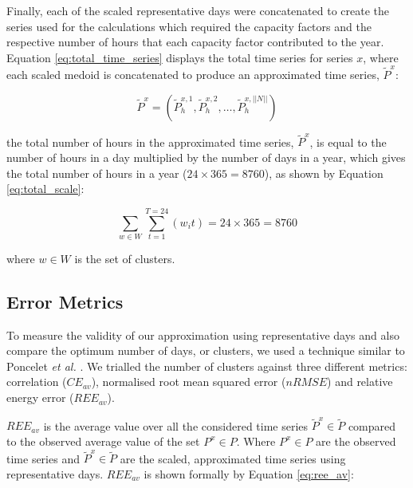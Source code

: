 
Finally, each of the scaled representative days were concatenated to create the series used for the calculations which required the capacity factors and the respective number of hours that each capacity factor contributed to the year. Equation \ref{eq:total_time_series} displays the total time series for series $x$, where each scaled medoid is concatenated to produce an approximated time series, $\widetilde{P}^x$:


\begin{equation}
\label{eq:total_time_series}
\widetilde{P}^x=\left(\widetilde{P}^{x,1}_{h},\widetilde{P}^{x,2}_{h},\ldots, \widetilde{P}^{x,||N||}_{h}\right)
\end{equation}

\noindent the total number of hours in the approximated time series, $\widetilde{P}^x$, is equal to the number of hours in a day multiplied by the number of days in a year, which gives the total number of hours in a year ($24\times 365=8760$), as shown by Equation \ref{eq:total_scale}:


\begin{equation}
\label{eq:total_scale}
\sum\limits_{w\in W}\sum\limits_{t=1}^{T=24}\left(w_i t\right)=24\times 365=8760
\end{equation}

\noindent where $w\in W$ is the set of clusters.

\subsection{Error Metrics}

To measure the validity of our approximation using representative days and also compare the optimum number of days, or clusters, we used a technique similar to Poncelet \textit{et al.} \cite{Dhaeseleer2015, Poncelet2017}. We trialled the number of clusters against three different metrics: correlation ($CE_{av}$), normalised root mean squared error ($nRMSE$) and relative energy error ($REE_{av}$). 

$REE_{av}$ is the average value over all the considered time series $\widetilde{P}^x{\in} \widetilde{P}$ compared to the observed average value of the set $P^x\in P$. Where $P^x\in P$ are the observed time series and $\widetilde{P}^x{\in} \widetilde{P}$ are the scaled, approximated time series using representative days. $REE_{av}$ is shown formally by Equation \ref{eq:ree_av}:


